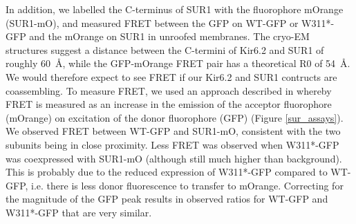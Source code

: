 In addition, we labelled the C-terminus of SUR1 with the fluorophore mOrange (SUR1-mO), and measured FRET between the GFP on WT-GFP or W311*-GFP and the mOrange on SUR1 in unroofed membranes.
The cryo-EM structures suggest a distance between the C-termini of Kir6.2 and SUR1 of roughly \SI{60}{\angstrom}, while the GFP-mOrange FRET pair has a theoretical R0 of \SI{54}{\angstrom}.
We would therefore expect to see FRET if our Kir6.2 and SUR1 contructs are coassembling.
To measure FRET, we used an approach described in \cite{zheng_rod_2002} whereby FRET is measured as an increase in the emission of the acceptor fluorophore (mOrange) on excitation of the donor fluorophore (GFP) (Figure \ref{sur_assays}).
We observed FRET between WT-GFP and SUR1-mO, consistent with the two subunits being in close proximity.
Less FRET was observed when W311*-GFP was coexpressed with SUR1-mO (although still much higher than background).
This is probably due to the reduced expression of W311*-GFP compared to WT-GFP, i.e. there is less donor fluorescence to transfer to mOrange.
Correcting for the magnitude of the GFP peak results in observed ratios for WT-GFP and W311*-GFP that are very similar.

